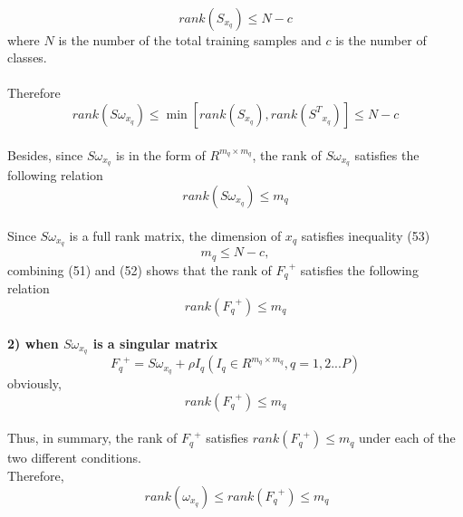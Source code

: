 \documentclass[journal]{IEEEtran}
\begin{document}
\\\indent
\begin{equation}
rank({S_{{x_q}}}) \le N - c
\end{equation}
where $N$ is the number of the total training samples and $c$ is the number of classes.\\
\\\indent Therefore
\begin{equation}
rank(S{\omega _{{x_q}}}) \le \min [rank({S_{{x_q}}}),rank({S^T}_{{x_q}})] \le N - c
\end{equation}
\\\indent Besides, since ${S{\omega_{{{x_q}}}}} $ is in the form of $R^{{m_q}\times {m_q}}$, the rank of $S{\omega _{{x_q}}}$ satisfies the following relation
\begin{equation}
rank(S{\omega _{{x_q}}}) \le {m_q}
\end{equation}
\\\indent Since ${S{\omega_{{{x_q}}}}} $ is a full rank matrix, the dimension of $x_q$ satisfies inequality (53)
\begin{equation}
{m_q}\le N-c,
\end{equation}
combining (51) and (52) shows that the rank of ${{F_q}^ +}$ satisfies the following relation
\begin{equation}
rank({{F_q}^ +}) \le {m_q}
\end{equation}\\\indent
\textbf{2) when ${S{\omega_{{{x_q}}}}}$ is a singular matrix}
\begin{equation}
{F_q}^ +  = S{\omega _{{x_q}}} + \rho {I_q}({I_q} \in {R^{{m_q} \times {m_q}}}, q = 1,2...P)
\end{equation}
obviously,
\begin{equation}
rank({{F_q}^ +}) \le {m_q}
\end{equation}
\\\indent Thus, in summary, the rank of ${{F_q}^ +}$ satisfies $rank({{F_q}^ +}) \le {m_q}$ under each of the two different conditions.\\\indent Therefore,
\begin{equation}
\ rank(\omega _{{x_q}}) \le rank({{F_q}^ +}) \le {m_q}
\end{equation}
\end{document}

